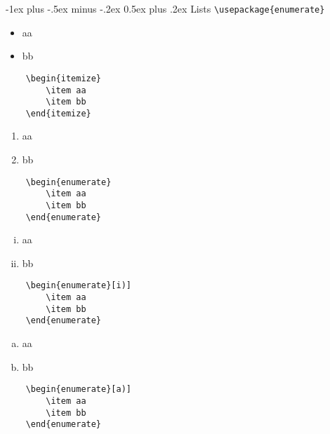 \documentclass[a4paper,10pt,landscape]{article}
\makeatletter
\theoremstyle{definition}
\theoremstyle{remark}
\renewcommand{\section}{\@startsection{section}{1}{0mm}%
                                {-1ex plus -.5ex minus -.2ex}%
                                {0.5ex plus .2ex}%
                                {\normalfont\large\bfseries}}
\makeatother
\begin{document}
\begin{multicols}{3}
\section{Lists}
\verb!\usepackage{enumerate}!
\begin{multicols}{2}
	\begin{itemize}
		\item aa
		\item bb
	\end{itemize}
\columnbreak
	\begin{verbatim}
	\begin{itemize}
		\item aa
		\item bb
	\end{itemize}
	\end{verbatim}
\end{multicols}
\begin{multicols}{2}
	\begin{enumerate}
		\item aa
		\item bb
	\end{enumerate}
\columnbreak
	\begin{verbatim}
	\begin{enumerate}
		\item aa
		\item bb
	\end{enumerate}
	\end{verbatim}
\end{multicols}
\begin{multicols}{2}
	\begin{enumerate}[i)]
		\item aa
		\item bb
	\end{enumerate}
\columnbreak
	\begin{verbatim}
	\begin{enumerate}[i)]
		\item aa
		\item bb
	\end{enumerate}
	\end{verbatim}
\end{multicols}
\begin{multicols}{2}
	\begin{enumerate}[a)]
		\item aa
		\item bb
	\end{enumerate}
\columnbreak
	\begin{verbatim}
	\begin{enumerate}[a)]
		\item aa
		\item bb
	\end{enumerate}
	\end{verbatim}
\end{multicols}





\end{multicols}
\end{document}
